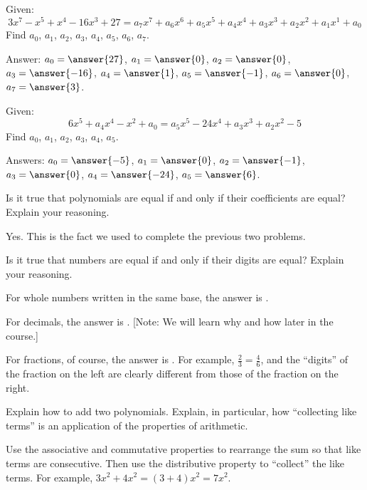 \documentclass[nooutcomes]{ximera}
\begin{document}
\begin{problem}Given:
\[
3x^7 -x^5 + x^4 -16x^3 + 27 = a_7 x^7 + a_6x^6 + a_5x^5 + a_4x^4 + a_3x^3 + a_2x^2 + a_1x^1 + a_0
\]
Find $a_0$, $a_1$, $a_2$, $a_3$, $a_4$, $a_5$, $a_6$, $a_7$.

Answer: $a_0=\answer{27}$, $a_1=\answer{0}$, $a_2=\answer{0}$, $a_3=\answer{-16}$, $a_4=\answer{1}$, $a_5=\answer{-1}$, $a_6=\answer{0}$, $a_7=\answer{3}$.
\end{problem} 

\begin{problem}Given:
\[
6x^5+a_4 x^4 -x^2 + a_0 = a_5 x^5 - 24 x^4 + a_3 x^3 + a_2 x^2 - 5
\]
Find $a_0$, $a_1$, $a_2$, $a_3$, $a_4$, $a_5$.

Answers: $a_0=\answer{-5}$, $a_1=\answer{0}$, $a_2=\answer{-1}$, $a_3=\answer{0}$, $a_4=\answer{-24}$, $a_5=\answer{6}$.
\end{problem} 

\begin{problem}Is it true that polynomials are equal if and only if their
  coefficients are equal? Explain your reasoning.
\begin{freeResponse}
\begin{hint}
Yes.  This is the fact we used to complete the previous two problems.
\end{hint}
\end{freeResponse}
\end{problem} 

\begin{problem}Is it true that numbers are equal if and only if their digits
  are equal? Explain your reasoning.
\begin{freeResponse}
\begin{hint}
For whole numbers written in the same base, the answer is .  

For decimals, the answer is .  [Note: We will learn why and how later in the course.] 

For fractions, of course, the answer is .  For example, $\frac{2}{3}=\frac{4}{6}$, and the ``digits'' of the fraction on the left are clearly different from those of the fraction on the right. 
\end{hint}
\end{freeResponse}
\end{problem} 

\begin{problem}Explain how to add two polynomials.  Explain, in particular, how ``collecting like terms'' is
an application of the properties of arithmetic.  
\begin{freeResponse}
\begin{hint}
Use the associative and commutative properties to rearrange the sum so that like terms are consecutive.  Then use the distributive property to ``collect'' the like terms. For example, $3x^2+4x^2 = (3+4)x^2 = 7x^2$. 
\end{hint}
\end{freeResponse}
\end{problem} 
\end{document}
